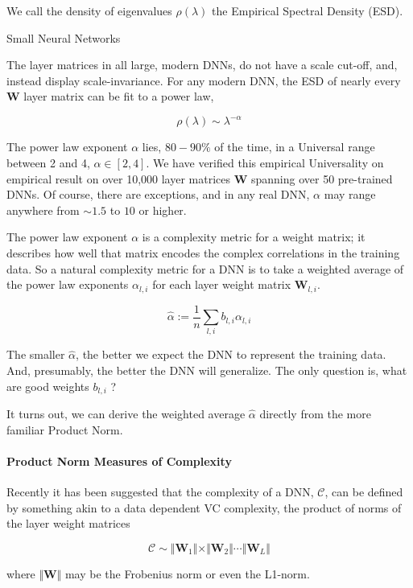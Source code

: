 We call the density of eigenvalues $\rho(\lambda)$ the Empirical Spectral Density (ESD).  

Small Neural Networks 

The layer matrices in all large, modern DNNs, do not have a scale cut-off, and, instead display scale-invariance.  
For any modern DNN, the ESD of nearly every \ $\mathbf{W}$ layer matrix can be fit to a power law,

$$\rho(\lambda)\sim\lambda^{-\alpha}$$

The power law exponent $\alpha$ lies, $80-90\%$ of the time, in a Universal range between 2 and 4, $\alpha\in[2,4]$.
We have verified this empirical Universality on empirical result on over 10,000 layer matrices $\mathbf{W}$ spanning over 50 pre-trained DNNs.
Of course, there are exceptions, and in any real DNN,  $\alpha$ may range anywhere from $\sim1.5$ to $10$ or higher.  

The power law exponent $\alpha$ is a complexity metric for a weight matrix; it describes how well that matrix encodes the complex correlations in the training data.
So a natural complexity metric for a DNN is to take a weighted average of the power law exponents $\alpha_{l,i}$ for each layer weight matrix $\mathbf{W}_{l,i}$.

$$\hat{\alpha}:=\dfrac{1}{n}\sum_{l,i}b_{l,i}\alpha_{l,i}$$

The smaller $\hat{\alpha}$, the better we expect the DNN to represent the training data. And, presumably, the better the DNN will generalize.
The only question is, what are good weights $b_{l,i}$ ?

It turns out, we can derive the weighted average $\hat{\alpha}$ directly from the more familiar Product Norm.

\paragraph{Product Norm Measures of Complexity}

Recently it has been suggested that the complexity of a DNN, $\mathcal{C}$,  can be defined by something akin to a data dependent VC complexity, the product of norms of the layer weight matrices

$$\mathcal{C}\sim\Vert\mathbf{W}_{1}\Vert\times\Vert\mathbf{W}_{2}\Vert\cdots\Vert\mathbf{W}_{L}\Vert$$

where $\Vert\mathbf{W}\Vert$ may be the Frobenius norm or even the L1-norm.


